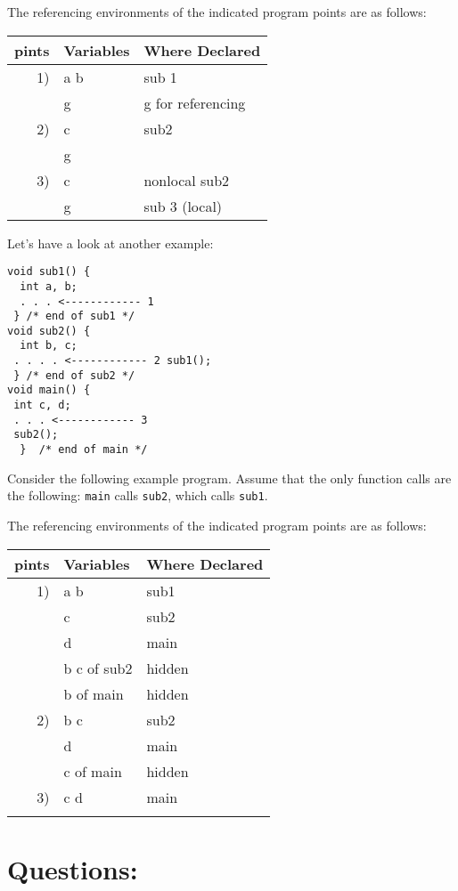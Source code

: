 \documentclass[11pt]{article}
\begin{document}
The referencing environments of the indicated program points are as follows:


\begin{center}
\begin{tabular}{rll}
\hline
pints & Variables & Where Declared\\
\hline
1) & a b & sub 1\\
 & g & g for referencing\\
\hline
2) & c & sub2\\
 & g & \\
\hline
3) & c & nonlocal sub2\\
 & g & sub 3 (local)\\
\hline
\end{tabular}
\end{center}

Let's have a look at another example:

\begin{verbatim}
void sub1() {
  int a, b;
  . . . <------------ 1
 } /* end of sub1 */
void sub2() {
  int b, c;
 . . . . <------------ 2 sub1();
 } /* end of sub2 */
void main() {
 int c, d;
 . . . <------------ 3
 sub2();
  }  /* end of main */
\end{verbatim}

Consider the following example program. Assume that the only function calls are
the following: \texttt{main} calls \texttt{sub2}, which calls \texttt{sub1}.

The referencing environments of the indicated program points are as follows:

\begin{center}
\begin{tabular}{rll}
\hline
pints & Variables & Where Declared\\
\hline
1) & a b & sub1\\
 & c & sub2\\
 & d & main\\
 & b c of sub2 & hidden\\
 & b of main & hidden\\
\hline
2) & b c & sub2\\
 & d & main\\
 & c of main & hidden\\
\hline
3) & c d & main\\
 &  & \\
\hline
\end{tabular}
\end{center}

\section{Questions:}
\label{sec:org1bbf1f2}
\end{document}
